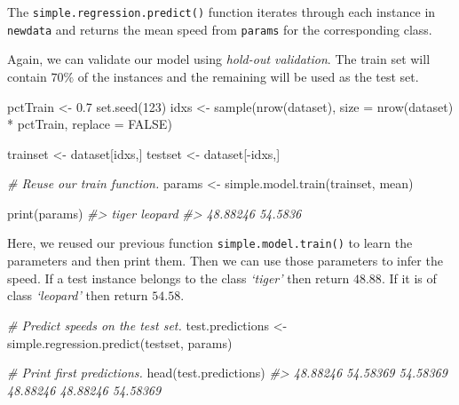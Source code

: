 \documentclass[
  11pt,
]{krantz}
\newenvironment{Shaded}{\begin{snugshade}}{\end{snugshade}}
\newcommand{\AttributeTok}[1]{\textcolor[rgb]{0.61,0.61,0.61}{#1}}
\newcommand{\CommentTok}[1]{\textcolor[rgb]{0.37,0.37,0.37}{\textit{#1}}}
\newcommand{\ConstantTok}[1]{\textcolor[rgb]{0,0,0}{#1}}
\newcommand{\DecValTok}[1]{\textcolor[rgb]{0.06,0.06,0.06}{#1}}
\newcommand{\FloatTok}[1]{\textcolor[rgb]{0.06,0.06,0.06}{#1}}
\newcommand{\FunctionTok}[1]{\textcolor[rgb]{0,0,0}{#1}}
\newcommand{\NormalTok}[1]{#1}
\newcommand{\OtherTok}[1]{\textcolor[rgb]{0.37,0.37,0.37}{#1}}
\newcommand{\SpecialCharTok}[1]{\textcolor[rgb]{0,0,0}{#1}}
\begin{document}
The \texttt{simple.regression.predict()} function iterates through each instance in \texttt{newdata} and returns the mean speed from \texttt{params} for the corresponding class.

Again, we can validate our model using \emph{hold-out validation}. The train set will contain \(70\%\) of the instances and the remaining will be used as the test set.

\begin{Shaded}
\begin{Highlighting}[]
\NormalTok{pctTrain }\OtherTok{\textless{}{-}} \FloatTok{0.7}
\FunctionTok{set.seed}\NormalTok{(}\DecValTok{123}\NormalTok{)}
\NormalTok{idxs }\OtherTok{\textless{}{-}} \FunctionTok{sample}\NormalTok{(}\FunctionTok{nrow}\NormalTok{(dataset),}
               \AttributeTok{size =} \FunctionTok{nrow}\NormalTok{(dataset) }\SpecialCharTok{*}\NormalTok{ pctTrain,}
               \AttributeTok{replace =} \ConstantTok{FALSE}\NormalTok{)}

\NormalTok{trainset }\OtherTok{\textless{}{-}}\NormalTok{ dataset[idxs,]}
\NormalTok{testset }\OtherTok{\textless{}{-}}\NormalTok{ dataset[}\SpecialCharTok{{-}}\NormalTok{idxs,]}

\CommentTok{\# Reuse our train function.}
\NormalTok{params }\OtherTok{\textless{}{-}} \FunctionTok{simple.model.train}\NormalTok{(trainset, mean)}

\FunctionTok{print}\NormalTok{(params)}
\CommentTok{\#\textgreater{}    tiger  leopard }
\CommentTok{\#\textgreater{} 48.88246 54.5836}
\end{Highlighting}
\end{Shaded}

Here, we reused our previous function \texttt{simple.model.train()} to learn the parameters and then print them. Then we can use those parameters to infer the speed. If a test instance belongs to the class \emph{`tiger'} then return \(48.88\). If it is of class \emph{`leopard'} then return \(54.58\).

\begin{Shaded}
\begin{Highlighting}[]
\CommentTok{\# Predict speeds on the test set.}
\NormalTok{test.predictions }\OtherTok{\textless{}{-}} 
  \FunctionTok{simple.regression.predict}\NormalTok{(testset, params)}

\CommentTok{\# Print first predictions.}
\FunctionTok{head}\NormalTok{(test.predictions)}
\CommentTok{\#\textgreater{} 48.88246 54.58369 54.58369 48.88246 48.88246 54.58369 }
\end{Highlighting}
\end{Shaded}
\end{document}
